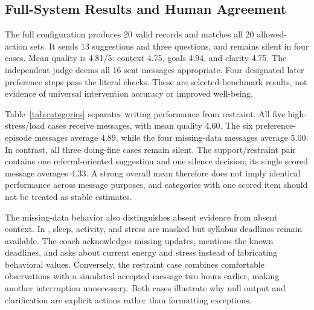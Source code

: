 \documentclass{article}
\newcommand{\code}[1]{\texttt{\detokenize{#1}}}
\begin{document}
\subsection{Full-System Results and Human Agreement}
The full configuration produces 20 valid records and matches all 20 allowed-action sets. It sends 13 suggestions and three questions, and remains silent in four cases. Mean quality is 4.81/5: context 4.75, goals 4.94, and clarity 4.75. The independent judge deems all 16 sent messages appropriate. Four designated later preference steps pass the literal checks. These are selected-benchmark results, not evidence of universal intervention accuracy or improved well-being.

\begin{table}[t]
\caption{Full-system performance by scenario. $N_m$ is the non-null count; silence has no quality score.}
\label{tab:categories}\centering\scriptsize\setlength{\tabcolsep}{3pt}
\resizebox{\columnwidth}{!}{}
\end{table}

Table~\ref{tab:categories} separates writing performance from restraint. All five high-stress/load cases receive messages, with mean quality 4.60. The six preference-episode messages average 4.89, while the four missing-data messages average 5.00. In contrast, all three doing-fine cases remain silent. The support/restraint pair contains one referral-oriented suggestion and one silence decision; its single scored message averages 4.33. A strong overall mean therefore does not imply identical performance across message purposes, and categories with one scored item should not be treated as stable estimates.

The missing-data behavior also distinguishes absent evidence from absent context. In \code{case_011}, sleep, activity, and stress are masked but syllabus deadlines remain available. The coach acknowledges missing updates, mentions the known deadlines, and asks about current energy and stress instead of fabricating behavioral values. Conversely, the restraint case combines comfortable observations with a simulated accepted message two hours earlier, making another interruption unnecessary. Both cases illustrate why null output and clarification are explicit actions rather than formatting exceptions.

\begin{table}[t]
\caption{Independent human and LLM ratings on 10 identical full-system messages. Means are shown with sample standard deviations. MAD is defined in Section~\ref{sec:metrics}; the final row first averages criteria within each message.}
\label{tab:human}\centering\small
\end{table}
\end{document}
